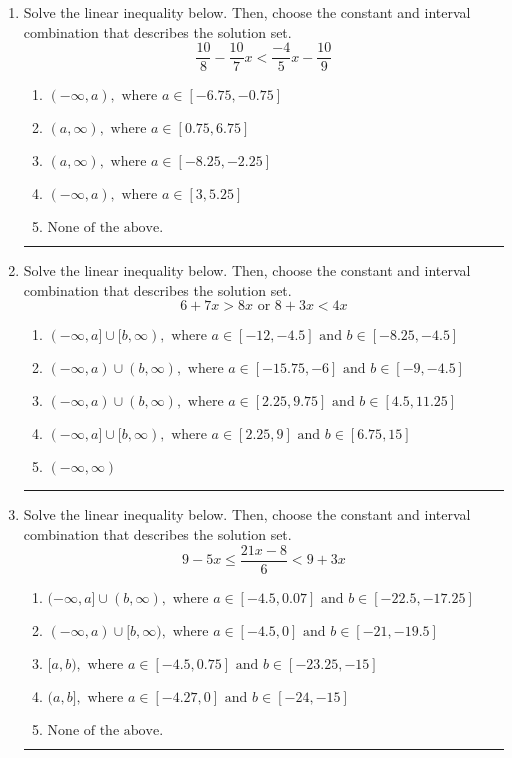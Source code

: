 \documentclass[14pt]{extbook}
\newcommand{\litem}[1]{\item#1\hspace*{-1cm}\rule{\textwidth}{0.4pt}}
\begin{document}
\begin{enumerate}
{\begin{enumerate}[label=\Alph*.]
\end{enumerate} }
\litem{
Solve the linear inequality below. Then, choose the constant and interval combination that describes the solution set.\[ \frac{10}{8} - \frac{10}{7} x < \frac{-4}{5} x - \frac{10}{9} \]\begin{enumerate}[label=\Alph*.]
\item \( (-\infty, a), \text{ where } a \in [-6.75, -0.75] \)
\item \( (a, \infty), \text{ where } a \in [0.75, 6.75] \)
\item \( (a, \infty), \text{ where } a \in [-8.25, -2.25] \)
\item \( (-\infty, a), \text{ where } a \in [3, 5.25] \)
\item \( \text{None of the above}. \)

\end{enumerate} }
\litem{
Solve the linear inequality below. Then, choose the constant and interval combination that describes the solution set.\[ 6 + 7 x > 8 x \text{ or } 8 + 3 x < 4 x \]\begin{enumerate}[label=\Alph*.]
\item \( (-\infty, a] \cup [b, \infty), \text{ where } a \in [-12, -4.5] \text{ and } b \in [-8.25, -4.5] \)
\item \( (-\infty, a) \cup (b, \infty), \text{ where } a \in [-15.75, -6] \text{ and } b \in [-9, -4.5] \)
\item \( (-\infty, a) \cup (b, \infty), \text{ where } a \in [2.25, 9.75] \text{ and } b \in [4.5, 11.25] \)
\item \( (-\infty, a] \cup [b, \infty), \text{ where } a \in [2.25, 9] \text{ and } b \in [6.75, 15] \)
\item \( (-\infty, \infty) \)

\end{enumerate} }
\litem{
Solve the linear inequality below. Then, choose the constant and interval combination that describes the solution set.\[ 9 - 5 x \leq \frac{21 x - 8}{6} < 9 + 3 x \]\begin{enumerate}[label=\Alph*.]
\item \( (-\infty, a] \cup (b, \infty), \text{ where } a \in [-4.5, 0.07] \text{ and } b \in [-22.5, -17.25] \)
\item \( (-\infty, a) \cup [b, \infty), \text{ where } a \in [-4.5, 0] \text{ and } b \in [-21, -19.5] \)
\item \( [a, b), \text{ where } a \in [-4.5, 0.75] \text{ and } b \in [-23.25, -15] \)
\item \( (a, b], \text{ where } a \in [-4.27, 0] \text{ and } b \in [-24, -15] \)
\item \( \text{None of the above.} \)


\end{enumerate}}
\end{enumerate}
\end{document}
